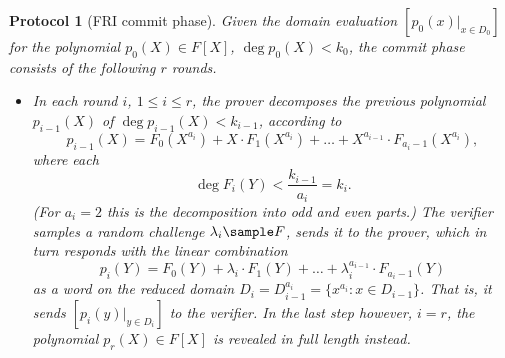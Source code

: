\documentclass[11pt]{article}
\newtheorem{protocol}[]{Protocol}
\theoremstyle{definition}
\theoremstyle{remark}
\begin{document}
\begin{protocol}[FRI commit phase]
Given the domain evaluation $[p_0(x)|_{x\in D_0}]$ for the polynomial $p_0(X)\in F[X]$, $\deg p_0(X) < k_0$, the commit phase consists of the following $r$ rounds.
\begin{itemize}
\item
In each round $i$, $1\leq i\leq r$, the prover decomposes the previous polynomial $p_{i-1}(X)$ of $\deg p_{i-1}(X) < k_{i-1}$,  
according to
\begin{equation}
\label{e:FRIdecomposition}
p_{i-1}(X) = F_0(X^{a_i})+ X\cdot F_1(X^{a_i})+  \ldots +X^{a_{i-1}} \cdot F_{a_i-1}(X^{a_i}),
\end{equation}
where each 
\[
\deg F_i(Y) <  \frac{k_{i-1}}{a_i} = k_i.
\] 
(For $a_i=2$ this is the decomposition into odd and even parts.)
The verifier samples a random challenge $\lambda_i\sample F$, sends it to the prover, which in turn responds with the linear combination
\begin{equation*}
p_i(Y)=F_0(Y)+ \lambda_i \cdot F_1(Y)+  \ldots + \lambda_i^{a_{i-1}} \cdot F_{a_i-1}(Y)
\end{equation*}
as a word on the reduced domain $D_i= D_{i-1}^{a_i} =\{x^{a_i}: x\in D_{i-1}\}$. 
That is, it sends
$
[p_i(y)|_{y\in D_i}]
$ 
to the verifier. 
In the last step however, $i=r$, the polynomial 
$p_r(X)\in F[X]$
is revealed in full length instead.
\end{itemize}
\end{protocol}
\end{document}

